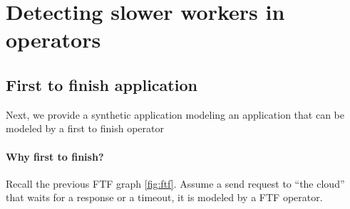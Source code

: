 \section{Detecting slower workers in operators}
    \subsection{First to finish application}
        Next, we provide a synthetic application modeling an application that can be modeled by a first to finish operator

        \paragraph{Why first to finish?} Recall the previous FTF graph \cref{fig:ftf}. Assume a send request to ``the cloud'' that waits for a response or a timeout, it is modeled by a FTF operator. \cite{dq-tut}
